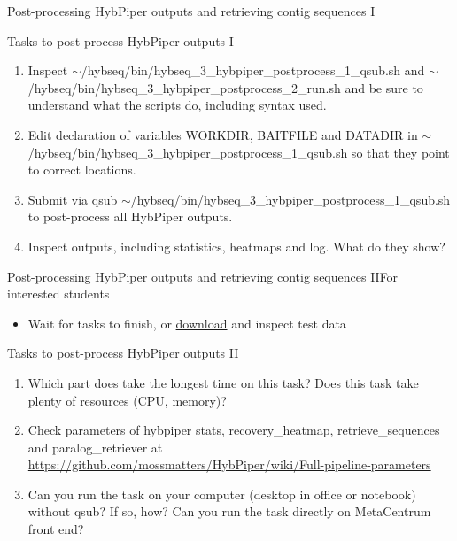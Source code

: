 \documentclass[compress,  xelatex, 11pt, xcolor=x11names, aspectratio=169,
	hyperref={
		bookmarks=true,
		unicode=true,
		colorlinks=true,
		pdftitle={HybSeq course},
		plainpages=false,
		pdfauthor={Vojtech Zeisek},
		pdfsubject={Practical processing of HybSeq target enrichment sequencing data on computing grids like MetaCentrum},
		pdfcreator={XeLaTeX},
		pdfkeywords={BASH, command line, GNU, HybSeq, Linux, MetaCentrum, sequencing shell, target enrichment},
		linkcolor=Turquoise4, %
		anchorcolor=DodgerBlue4, %
		citecolor=DodgerBlue4, %
		filecolor=DodgerBlue4, %
		menucolor=Tan4, %
		urlcolor=DarkOliveGreen4 %
		},
	url={hyphens, lowtilde} %
	]{beamer}
\renewcommand{\texttt}[1]{\colorbox{Cornsilk2}{{\ttfamily #1}}}
\begin{document}
\begin{frame}{Post-processing HybPiper outputs and retrieving contig sequences I}
	\begin{exampleblock}{Tasks to post-process HybPiper outputs I}
		\begin{enumerate}
			\item Inspect \texttt{$\sim$/hybseq/bin/hybseq\_3\_hybpiper\_postprocess\_1\_qsub.sh} and \texttt{$\sim$/hybseq/bin/hybseq\_3\_hybpiper\_postprocess\_2\_run.sh} and be sure to understand what the scripts do, including syntax used.
			\item Edit declaration of variables \texttt{WORKDIR}, \texttt{BAITFILE} and \texttt{DATADIR} in \texttt{$\sim$/hybseq/bin/hybseq\_3\_hybpiper\_postprocess\_1\_qsub.sh} so that they point to correct locations.
			\item Submit via \texttt{qsub} \texttt{$\sim$/hybseq/bin/hybseq\_3\_hybpiper\_postprocess\_1\_qsub.sh} to post-process all HybPiper outputs.
			\item Inspect outputs, including statistics, heatmaps and log. What do they show?
		\end{enumerate}
	\end{exampleblock}
\end{frame}

\begin{frame}{Post-processing HybPiper outputs and retrieving contig sequences II}{For interested students}
	\vfill
	\begin{itemize}
		\item Wait for tasks to finish, or \href{https://botany.natur.cuni.cz/zeisek/hybseq_course_zingibers_2_hybpiper.zip}{download} and inspect test data
	\end{itemize}
	\vfill
	\begin{exampleblock}{Tasks to post-process HybPiper outputs II}
		\begin{enumerate}
			\item Which part does take the longest time on this task? Does this task take plenty of resources (CPU, memory)?
			\item Check parameters of \texttt{hybpiper stats}, \texttt{recovery\_heatmap}, \texttt{retrieve\_sequences} and \texttt{paralog\_retriever} at \url{https://github.com/mossmatters/HybPiper/wiki/Full-pipeline-parameters}
			\item Can you run the task on your computer (desktop in office or notebook) without \texttt{qsub}? If so, how? Can you run the task directly on MetaCentrum front end?
		\end{enumerate}
	\end{exampleblock}
	\vfill
\end{frame}
\end{document}
